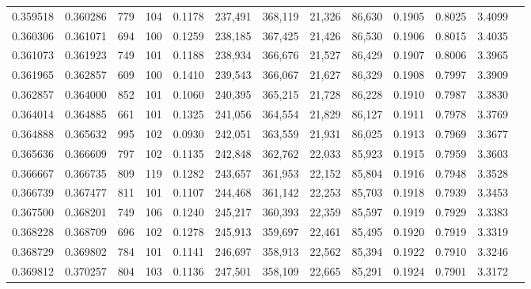 \begin{tabular}{rrrrrrrrrrrrr}
0.359518 & 0.360286 &    779 &   104 &                                     0.1178 & 237,491 & 368,119 &  21,326 &  86,630 & 0.1905 & 0.8025 & 3.4099 \\
0.360306 & 0.361071 &    694 &   100 &                                     0.1259 & 238,185 & 367,425 &  21,426 &  86,530 & 0.1906 & 0.8015 & 3.4035 \\
0.361073 & 0.361923 &    749 &   101 &                                     0.1188 & 238,934 & 366,676 &  21,527 &  86,429 & 0.1907 & 0.8006 & 3.3965 \\
0.361965 & 0.362857 &    609 &   100 &                                     0.1410 & 239,543 & 366,067 &  21,627 &  86,329 & 0.1908 & 0.7997 & 3.3909 \\
0.362857 & 0.364000 &    852 &   101 &                                     0.1060 & 240,395 & 365,215 &  21,728 &  86,228 & 0.1910 & 0.7987 & 3.3830 \\
0.364014 & 0.364885 &    661 &   101 &                                     0.1325 & 241,056 & 364,554 &  21,829 &  86,127 & 0.1911 & 0.7978 & 3.3769 \\
0.364888 & 0.365632 &    995 &   102 &                                     0.0930 & 242,051 & 363,559 &  21,931 &  86,025 & 0.1913 & 0.7969 & 3.3677 \\
0.365636 & 0.366609 &    797 &   102 &                                     0.1135 & 242,848 & 362,762 &  22,033 &  85,923 & 0.1915 & 0.7959 & 3.3603 \\
0.366667 & 0.366735 &    809 &   119 &                                     0.1282 & 243,657 & 361,953 &  22,152 &  85,804 & 0.1916 & 0.7948 & 3.3528 \\
0.366739 & 0.367477 &    811 &   101 &                                     0.1107 & 244,468 & 361,142 &  22,253 &  85,703 & 0.1918 & 0.7939 & 3.3453 \\
0.367500 & 0.368201 &    749 &   106 &                                     0.1240 & 245,217 & 360,393 &  22,359 &  85,597 & 0.1919 & 0.7929 & 3.3383 \\
0.368228 & 0.368709 &    696 &   102 &                                     0.1278 & 245,913 & 359,697 &  22,461 &  85,495 & 0.1920 & 0.7919 & 3.3319 \\
0.368729 & 0.369802 &    784 &   101 &                                     0.1141 & 246,697 & 358,913 &  22,562 &  85,394 & 0.1922 & 0.7910 & 3.3246 \\
0.369812 & 0.370257 &    804 &   103 &                                     0.1136 & 247,501 & 358,109 &  22,665 &  85,291 & 0.1924 & 0.7901 & 3.3172 \\

\end{tabular}
